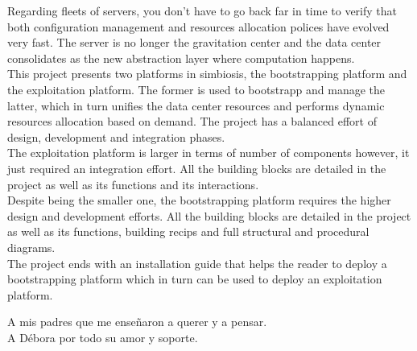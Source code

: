 \documentclass[a4paper,12pt,spanish,final]{epsc_tfc_pfc}
\begin{document}
\begin{overview}{1cm}
Regarding fleets of servers, you don't have to go back far in time to verify that both configuration management and resources allocation polices have evolved very fast. The server is no longer the gravitation center and the data center consolidates as the new abstraction layer where computation happens.\\

This project presents two platforms in simbiosis, the bootstrapping platform and the exploitation platform. The former is used to bootstrapp and manage the latter, which in turn unifies the data center resources and performs dynamic resources allocation based on demand. The project has a balanced effort of design, development and integration phases.\\

The exploitation platform is larger in terms of number of components however, it just required an integration effort. All the building blocks are detailed in the project as well as its functions and its interactions.\\

Despite being the smaller one, the bootstrapping platform requires the higher design and development efforts. All the building blocks are detailed in the project as well as its functions, building recips and full structural and procedural diagrams.\\

The project ends with an installation guide that helps the reader to deploy a bootstrapping platform which in turn can be used to deploy an exploitation platform.
\end{overview}



\begin{dedicatoria}
A mis padres que me enseñaron a querer y a pensar.\\
A Débora por todo su amor y soporte.
\end{dedicatoria}


\thispagestyle{empty}
\tableofcontents
\cleardoublepage{}
\thispagestyle{empty}
\listoffigures
\cleardoublepage{}
\thispagestyle{empty}
\listoftables
\cleardoublepage{}
\pagestyle{fancy}

\end{document}
